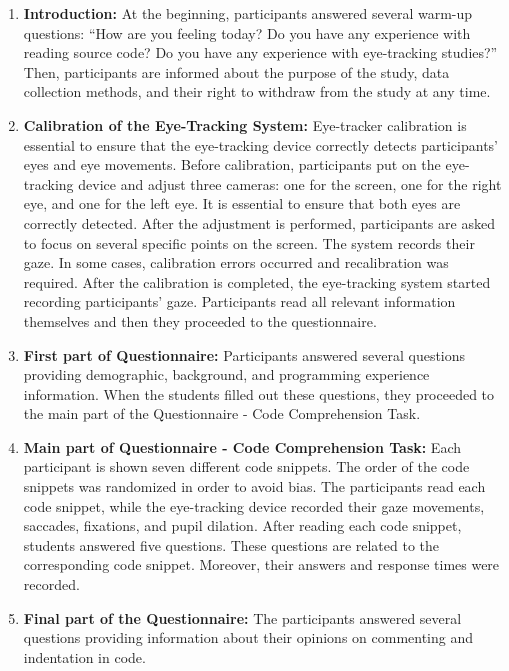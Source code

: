 \begin{enumerate}
    \item \textbf{Introduction:} At the beginning, participants answered several warm-up questions: “How are you feeling today? Do you have any experience with reading source code? Do you have any experience with eye-tracking studies?”  Then, participants are informed about the purpose of the study, data collection methods, and their right to withdraw from the study at any time.

    \item \textbf{Calibration of the Eye-Tracking System:} 
    Eye-tracker calibration is essential to ensure that the eye-tracking device correctly detects participants’ eyes and eye movements. Before calibration, participants put on the eye-tracking device and adjust three cameras: one for the screen, one for the right eye, and one for the left eye. It is essential to ensure that both eyes are correctly detected. After the adjustment is performed, participants are asked to focus on several specific points on the screen. The system records their gaze. In some cases, calibration errors occurred and recalibration was required. After the calibration is completed, the eye-tracking system started recording participants’ gaze. Participants read all relevant information themselves and then they proceeded to the questionnaire.
    
    \item \textbf{First part of Questionnaire:}  
    Participants answered several questions providing demographic, background, and programming experience information. When the students filled out these questions, they proceeded to the main part of the Questionnaire - Code Comprehension Task.

    \item \textbf{Main part of Questionnaire - Code Comprehension Task:}  Each participant is shown seven different code snippets. The order of the code snippets was randomized in order to avoid bias. The participants read each code snippet, while the eye-tracking device recorded their gaze movements, saccades, fixations, and pupil dilation. After reading each code snippet, students answered five questions. These questions are related to the corresponding code snippet. Moreover, their answers and response times were recorded.

    \item \textbf{Final part of the Questionnaire:} 
    The participants answered several questions providing information about their opinions on commenting and indentation in code.


\end{enumerate}
